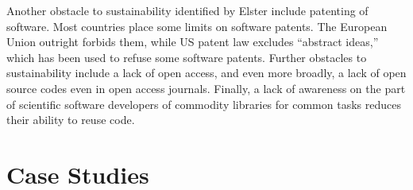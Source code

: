 \documentclass[11pt, oneside]{amsart}
\newcommand{\note}[1]{ {\textcolor{red}    { #1 }}}
\begin{document}
Another obstacle to
sustainability identified by Elster include patenting of software.
Most countries place some limits on software patents. The European 
Union outright forbids them, while US patent law excludes ``abstract ideas,'' 
which has been used to refuse some software patents.
%
Further obstacles to
sustainability include a lack of open access, and even more broadly, a lack of open source
codes even in open access journals.  Finally, a lack of awareness on
the part of scientific software developers of commodity libraries for
common tasks reduces their ability to reuse code.

\section{Case Studies} \label{sec:use-cases} %





\end{document}
